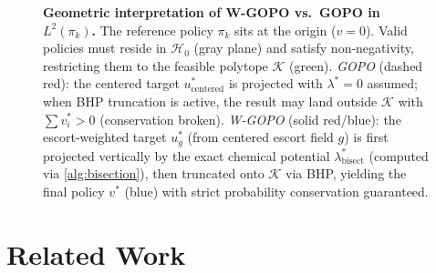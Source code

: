 \documentclass[11pt]{article}
\theoremstyle{definition}
\theoremstyle{remark}
\newcommand{\pik}{\pi_k}
\begin{document}
\begin{figure}[htbp]

\caption{\textbf{Geometric interpretation of W-GOPO vs.\ GOPO in $L^2(\pik)$.} The reference policy $\pik$ sits at the origin ($v=0$). Valid policies must reside in $\mathcal{H}_0$ (gray plane) and satisfy non-negativity, restricting them to the feasible polytope $\mathcal{K}$ (green). \emph{GOPO} (dashed red): the centered target $u^*_{\text{centered}}$ is projected with $\lambda^*=0$ assumed; when BHP truncation is active, the result may land outside $\mathcal{K}$ with $\sum v_i^* > 0$ (conservation broken). \emph{W-GOPO} (solid red/blue): the escort-weighted target $u^*_{g}$ (from centered escort field $g$) is first projected vertically by the exact chemical potential $\lambda^*_{\text{bisect}}$ (computed via \cref{alg:bisection}), then truncated onto $\mathcal{K}$ via BHP, yielding the final policy $v^*$ (blue) with strict probability conservation guaranteed.}
\label{fig:geometry}
\end{figure}

\section{Related Work}
\label{sec:related}
\end{document}
